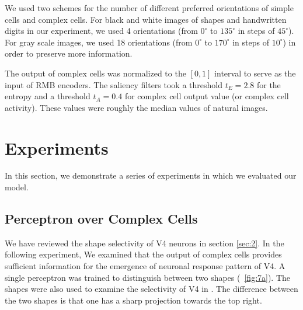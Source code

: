 \documentclass[conference]{IEEEtran}
\begin{document}
We used two schemes for the number of different preferred orientations of simple cells and complex cells.
For black and white images of shapes and handwritten digits in our experiment,
we used 4 orientations (from $0^\circ$ to $135^\circ$ in steps of $45^\circ$).
For gray scale images, we used 18 orientations (from $0^\circ$ to $170^\circ$ in steps of $10^\circ$)
in order to preserve more information.

The output of complex cells was normalized to the $[0,1]$ interval
to serve as the input of RMB encoders.
The saliency filters took a threshold $t_E=2.8$ for the entropy
and a threshold $t_A=0.4$ for complex cell output value (or complex cell activity).
These values were roughly the median values of natural images.

\section{Experiments}
\label{sec:4}

In this section, we demonstrate a series of experiments in which we evaluated our model.

\subsection{Perceptron over Complex Cells}

We have reviewed the shape selectivity of V4 neurons in section \ref{sec:2}.
In the following experiment, 
We examined that the output of complex cells provides sufficient information
for the emergence of neuronal response pattern of V4.
A single perceptron was trained to distinguish between two shapes (\figurename~\ref{fig:7a}).
The shapes were also used to examine the selectivity of V4 in \cite{pasupathy2001}.
The difference between the two shapes is that one has a sharp projection towards the top right.
\end{document}
